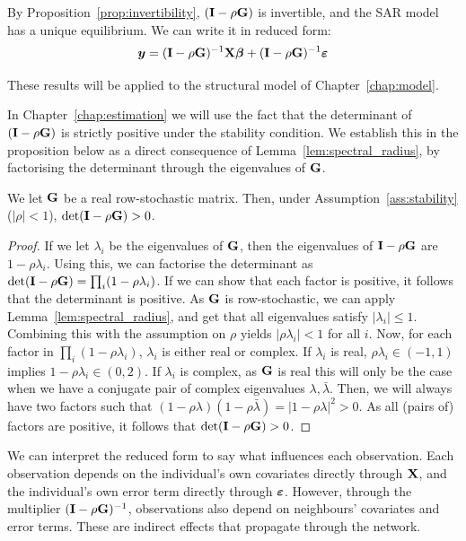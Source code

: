 By Proposition~\ref{prop:invertibility}, $(\mathbf{I} - \rho\mathbf{G})$ is invertible, and the SAR model has a unique equilibrium. We can write it in reduced form:
\begin{equation}
\label{eq:reduced_form}
    \bm{y} = (\mathbf{I} - \rho\mathbf{G})^{-1}\mathbf{X}\bm{\beta} + (\mathbf{I} - \rho\mathbf{G})^{-1}\bm{\varepsilon}
\end{equation}

These results will be applied to the structural model of Chapter~\ref{chap:model}.

In Chapter~\ref{chap:estimation} we will use the fact that the determinant of $(\mathbf{I} - \rho\mathbf{G})$ is strictly positive under the stability condition. We establish this in the proposition below as a direct consequence of Lemma~\ref{lem:spectral_radius}, by factorising the determinant through the eigenvalues of $\mathbf{G}$.

\begin{proposition}
\label{prop:det_positive}
    We let $\mathbf{G}$ be a real row-stochastic matrix. Then, under Assumption~\ref{ass:stability} ($|\rho| < 1$), $\det(\mathbf{I} - \rho\mathbf{G}) > 0$.
\end{proposition}

\begin{proof}
    If we let $\lambda_i$ be the eigenvalues of $\mathbf{G}$, then the eigenvalues of $\mathbf{I} - \rho\mathbf{G}$ are $1 - \rho\lambda_i$. Using this, we can factorise the determinant as $\det(\mathbf{I} - \rho\mathbf{G}) = \prod_i (1 - \rho\lambda_i)$. If we can show that each factor is positive, it follows that the determinant is positive. As $\mathbf{G}$ is row-stochastic, we can apply Lemma~\ref{lem:spectral_radius}, and get that all eigenvalues satisfy $|\lambda_i| \leq 1$. Combining this with the assumption on $\rho$ yields $|\rho\lambda_i| < 1$ for all $i$. Now, for each factor in $\prod_i (1 - \rho\lambda_i)$, $\lambda_i$ is either real or complex. If $\lambda_i$ is real, $\rho\lambda_i \in (-1, 1)$ implies $1 - \rho\lambda_i \in (0, 2)$. If $\lambda_i$ is complex, as $\mathbf{G}$ is real this will only be the case when we have a conjugate pair of complex eigenvalues $\lambda, \bar{\lambda}$. Then, we will always have two factors such that $(1 - \rho\lambda)(1 - \rho\bar{\lambda}) = |1 - \rho\lambda|^2 > 0$. As all (pairs of) factors are positive, it follows that $\det(\mathbf{I} - \rho\mathbf{G}) > 0$.
\end{proof}

We can interpret the reduced form to say what influences each observation. Each observation depends on the individual's own covariates directly through $\mathbf{X}$, and the individual's own error term directly through $\bm{\varepsilon}$. However, through the multiplier $(\mathbf{I} - \rho\mathbf{G})^{-1}$, observations also depend on neighbours' covariates and error terms. These are indirect effects that propagate through the network.

